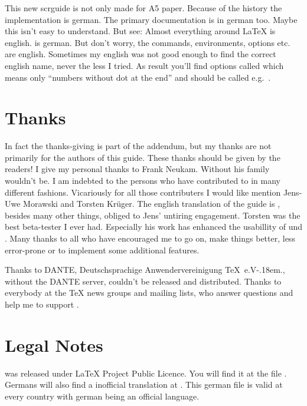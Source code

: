 This new scrguide is not only made for A5 paper. Because of the
history the implementation is german. The primary documentation is in
german too. Maybe this isn't easy to understand. But see: Almost
everything around \LaTeX{} is english. \KOMAScript{} is german. But
don't worry, the commands, environments, options etc. are
english. Sometimes my english was not good enough to find the correct
english name, never the less I tried. As result you'll find options
called  which means only ``numbers without
dot at the end'' and should be called e.g.\ .


\section{Thanks}\label{sec:introduction.thanks}

In fact the thanks-giving is part of the addendum, but my thanks are not
primarily for the authors of this guide.  These thanks should be given by the
readers!  I give my personal thanks to Frank Neukam. Without his \Script{}
family \KOMAScript{} wouldn't be.  I am indebted to the persons who have
contributed to {\KOMAScript} in many different fashions.  Vicariously for all
those contributers I would like mention Jens-Uwe Morawski and Torsten
Kr\"uger.  The english translation of the guide is , besides many other
things, obliged to Jens' untiring engagement.  Torsten was the best
beta-tester I ever had. Especially his work has enhanced the usabillity of
 und .  Many thanks to all who have encouraged
me to go on, make things better, less error-prone or to implement some
additional features.

Thanks to DANTE, Deutschsprachige Anwendervereinigung \TeX~e.V\kern-.18em.,
without the DANTE server, \KOMAScript{} couldn't be released and distributed.
Thanks to everybody at the \TeX{} news groups and mailing lists, who answer
questions and help me to support \KOMAScript{}.

\section{Legal Notes}\label{sec:introduction.legal}

{\KOMAScript} was released under {\LaTeX} Project Public Licence. You
will find it at the file . Germans will also find a
inofficial translation at . This german file is
valid at every country with german being an official language.

